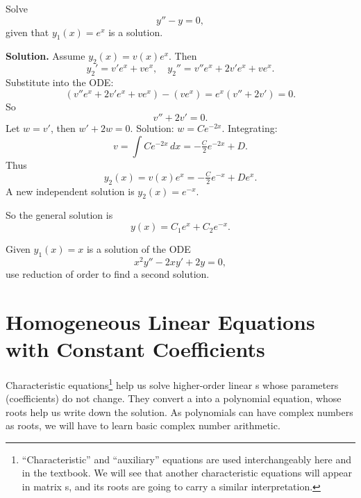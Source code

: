 \begin{example}
Solve
\[
y'' - y = 0,
\]
given that $y_1(x)=e^x$ is a solution.

\textbf{Solution.}  
Assume $y_2(x) = v(x)e^x$. Then
\[
y_2' = v'e^x + ve^x, \quad y_2''= v''e^x+2v'e^x+ve^x.
\]
Substitute into the ODE:
\[
(v''e^x+2v'e^x+ve^x) - (ve^x) = e^x(v''+2v')=0.
\]
So
\[
v''+2v'=0.
\]
Let $w=v'$, then $w'+2w=0$. Solution: $w=Ce^{-2x}$.  
Integrating:
\[
v=\int Ce^{-2x}\,dx = -\tfrac{C}{2}e^{-2x}+D.
\]
Thus
\[
y_2(x) = v(x)e^x = -\tfrac{C}{2}e^{-x}+De^x.
\]
A new independent solution is $y_2(x)=e^{-x}$.

So the general solution is
\[
y(x)=C_1 e^x + C_2 e^{-x}.
\]
\end{example}



\begin{question}
Given $y_1(x)=x$ is a solution of the ODE
\[
x^2y'' - 2xy' + 2y = 0,
\]
use reduction of order to find a second solution.
\end{question}




\section{Homogeneous Linear Equations with Constant Coefficients}
 
Characteristic equations\footnote{``Characteristic'' and ``auxiliary'' equations are used interchangeably here and in the textbook.
We will see that another characteristic equations will appear in matrix \ode{}s, and its roots are going to carry a similar interpretation.} 
help us solve higher-order linear \ode{}s whose parameters (coefficients) do not change. 
They convert a \ode{} into a polynomial equation, whose roots help us write down the solution.
As polynomials can have complex numbers as roots, we will have to learn basic complex number arithmetic.

